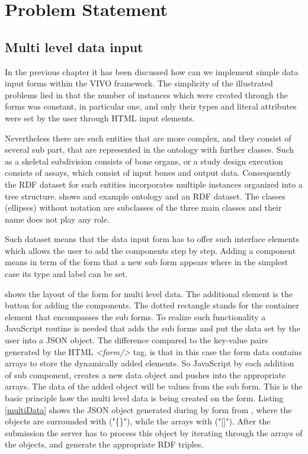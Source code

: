 \chapter{Problem Statement}


\section{Multi level data input}


In the previous chapter it has been discussed how can we implement simple data input forms within the VIVO framework. The simplicity of the illustrated problems lied in that the number of instances which were created through the forms was constant, in particular one, and only their types and literal attributes were set by the user through HTML input elements. 


Nevertheless there are such entities that are more complex, and they consist of several sub part, that are represented in the ontology with further classes. Such as a skeletal subdivision consists of bone organs, or a study design execution consists of assays, which consist of input bones and output data. Consequently the RDF dataset for such entities incorporates  multiple instances organized into a tree structure.  shows and example ontology and an RDF dataset. The classes (ellipses) without notation are subclasses of the three main classes and their name does not play any role.

Such dataset means that the data input form has to offer such interface elements which allows the user to add the components step by step. Adding a component means in term of the form that a new sub form appears where in the simplest case its type and label can be set.


 shows the layout of the form for multi level data. The additional element is the button for adding the components. The dotted rectangle stands for the container element that encompasses the sub forms. To realize such functionality a JavaScript routine is needed that adds the sub forms and put the data set by the user into a JSON object. The difference compared to the key-value pairs generated by the HTML \textit{<form/>} tag, is that 
in this case the form data contains arrays to store the dynamically added elements. So JavaScript by each addition of sub component, creates a new data object and pushes into the appropriate arrays. The data of the added object will be values from the sub form. This is the basic principle how the multi level data is being created on the form. Listing \ref{multiData} shows the JSON object generated during by form from , where the objects are surrounded with ("\{\}"), while the arrays with ("[]"). After the submission the server has to process this object by iterating through the arrays of the objects, and generate the appropriate RDF triples.

